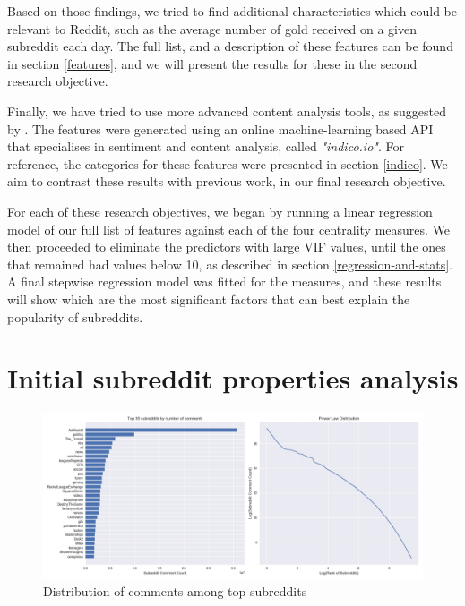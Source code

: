 \documentclass[bsc,frontabs,twoside,singlespacing,parskip,deptreport]{infthesis}
\begin{document}
Based on those findings, we tried to find additional characteristics which could be relevant to Reddit, such as the average number of gold received on a given subreddit each day. The full list, and a description of these features can be found in section \ref{features}, and we will present the results for these in the second research objective. 

Finally, we have tried to use more advanced content analysis tools, as suggested by \cite{lowe2002software}. The features were generated using an online machine-learning based API that specialises in sentiment and content analysis, called \textit{"indico.io"}. For reference, the categories for these features were presented in section \ref{indico}. We aim to contrast these results with previous work, in our final research objective.

For each of these research objectives, we began by running a linear regression model of our full list of features against each of the four centrality measures. We then proceeded to eliminate the predictors with large VIF values, until the ones that remained had values below 10, as described in section \ref{regression-and-stats}. A final stepwise regression model was fitted for the measures, and these results will show which are the most significant factors that can best explain the popularity of subreddits. 

\newpage

\section{Initial subreddit properties analysis}\label{replication}

\begin{figure}[hbt]
	\centering
  	\includegraphics[width=\textwidth]{zipfslaw.png}
  	\caption{Distribution of comments among top subreddits}
  	\label{fig:distribution-of-comments}
\end{figure}
\end{document}
